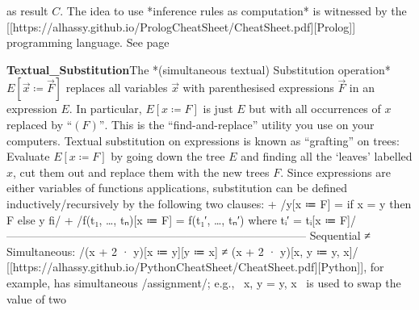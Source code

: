 \documentclass[11pt]{article}
\begin{document}
as result $C$. \quad The idea to use *inference rules as computation* is witnessed by the [[https://alhassy.github.io/PrologCheatSheet/CheatSheet.pdf][Prolog]] programming language. See page \pageref{org-special-block-extras-glossary-declaration-site-Inference_Rule}

\vspace{1em}\textbf{Textual_Substitution}\quad\label{org-special-block-extras-glossary-Textual_Substitution}The *(simultaneous textual) Substitution operation* $E[\vec x ≔ \vec F]$ replaces all variables $\vec x$ with parenthesised expressions $\vec F$ in an expression $E$. In particular, $E[x ≔ F]$ is just $E$ but with all occurrences of $x$ replaced by $“(F)”$. This is the “find-and-replace” utility you use on your computers.  Textual substitution on expressions is known as “grafting” on trees: Evaluate $E[x ≔ F]$ by going down the tree $E$ and finding all the ‘leaves’ labelled $x$, cut them out and replace them with the new trees $F$.  Since expressions are either variables of functions applications, substitution can be defined inductively/recursively by the following two clauses:  + /y[x ≔ F] \quad  \quad  \quad  \quad  \quad  \quad  = \quad if \quad x = y \quad then \quad F \quad else \quad y \quad fi/ + /f(t₁, …, tₙ)[x ≔ F] \quad = \quad f(t₁′, …, tₙ′) \quad  where \quad tᵢ′ = tᵢ[x ≔ F]/  --------------------------------------------------------------------------------  Sequential ≠ Simultaneous:  \quad /(x + 2 · y)[x ≔ y][y ≔ x] \quad ≠ \quad (x + 2 · y)[x, y ≔ y, x]/  [[https://alhassy.github.io/PythonCheatSheet/CheatSheet.pdf][Python]], for example, has simultaneous /assignment/; e.g., ~x, y = y, x~ is used to swap the value of two 
\end{document}

